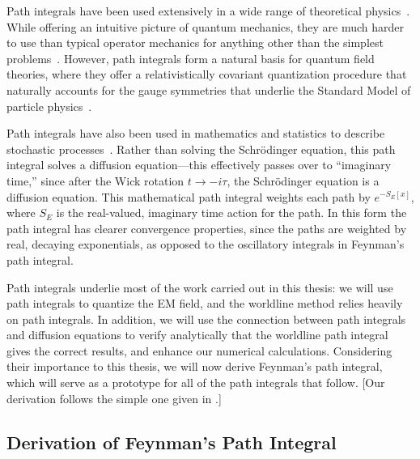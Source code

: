     Path integrals have been used extensively in a wide range of theoretical physics~\citep{Kleinert2012}.
    While offering an intuitive picture of quantum mechanics, they are much harder to use 
    than typical operator mechanics for anything other than the simplest problems~\citep{Feynman1965}.
    However, path integrals form a natural basis for quantum field theories, where they offer a relativistically covariant
    quantization procedure that naturally accounts for the gauge symmetries 
    that underlie the Standard Model of particle physics~\citep{Brown1994,Srednicki2008}.

    Path integrals have also been used in mathematics and statistics to describe stochastic 
    processes~\citep{Kac1949,Durrett1996, Karatzas1991}.  Rather than solving the Schr\"odinger equation, 
    this path integral solves a diffusion equation---this effectively passes over to ``imaginary time,''
    since after the Wick rotation $t\rightarrow -i \tau$, the Schr\"odinger equation is a diffusion equation.
    This mathematical path integral weights each path by $e^{-S_{E}[x]}$, where $S_E$ is the real-valued, imaginary time action for the path.
    In this form the path integral has clearer convergence properties, 
    since the paths are weighted by real, decaying exponentials, as opposed to the oscillatory integrals
    in Feynman's path integral.  

    Path integrals underlie most of the work carried out in this thesis: we will use path integrals
    to quantize the EM field, and the worldline method relies heavily on path integrals.
    In addition, we will use the connection between path integrals and diffusion equations
    to verify analytically that the worldline path integral gives the correct results, and enhance our numerical
    calculations.  Considering their importance to this thesis, we will 
    now derive Feynman's path integral, which will serve as a prototype for all of the path integrals
    that follow.  [Our derivation follows the simple one given in \citet{Sakurai1994}.]

    \subsection{Derivation of Feynman's Path Integral}


